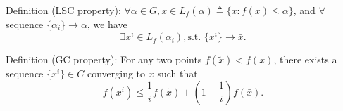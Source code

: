 \documentclass{article}%
\begin{document}
Definition (LSC property): $\forall \bar{\alpha} \in G, \bar{x} \in L_f(\bar{\alpha}) \triangleq \{ x: f(x) \leq \bar{\alpha} \}$,
and $\forall$ sequence $\{ \alpha_i \} \rightarrow \bar{\alpha}$, we have 
$$
\exists x^i \in L_f(\alpha_i), \text{s.t. } \{ x^i\} \rightarrow \bar{x}. 
$$

Definition (GC property): For any two points $ f(\tilde{x}) < f(\bar{x}) $, there exists a sequence $ \{x^i\} \in C$ converging to $ \bar{x} $
such that 
\begin{equation}
f(x^i)\leq \frac{1}{i} f(\tilde{x}) + (1 - \frac{1}{i})f(\bar{x}). 
\end{equation} 


 \vspace{0.3cm}

{\footnotesize

}
\end{document}
